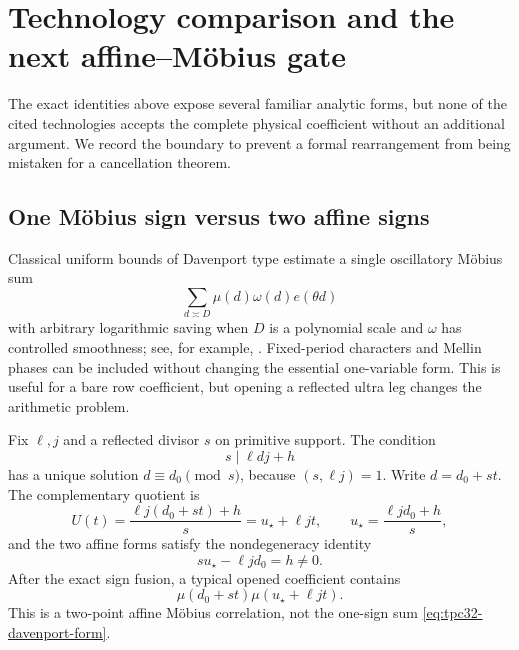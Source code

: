 \section{Technology comparison and the next affine--M\"obius gate}
\label{sec:tpc32-next-gate}

The exact identities above expose several familiar analytic forms, but none
of the cited technologies accepts the complete physical coefficient without
an additional argument.  We record the boundary to prevent a formal
rearrangement from being mistaken for a cancellation theorem.

\subsection{One M\"obius sign versus two affine signs}

Classical uniform bounds of Davenport type estimate a single oscillatory
M\"obius sum
\begin{equation}
 \sum_{d\asymp D}\mu(d)\omega(d)e(\theta d)
 \label{eq:tpc32-davenport-form}
\end{equation}
with arbitrary logarithmic saving when $D$ is a polynomial scale and
$\omega$ has controlled smoothness; see, for example,
\citet[Chapter~13]{IwaniecKowalski2004}.  Fixed-period characters and
Mellin phases can be included without changing the essential one-variable
form.  This is useful for a bare row coefficient, but opening a reflected
ultra leg changes the arithmetic problem.

Fix $\ell,j$ and a reflected divisor $s$ on primitive support.  The
condition
\begin{equation}
 s\mid \ell dj+h
 \label{eq:tpc32-reflected-divisibility}
\end{equation}
has a unique solution $d\equiv d_0\pmod s$, because
$(s,\ell j)=1$.  Write $d=d_0+st$.  The complementary quotient is
\begin{equation}
 U(t)=\frac{\ell j(d_0+st)+h}{s}
 =u_\star+\ell jt,
 \qquad
 u_\star=\frac{\ell jd_0+h}{s},
 \label{eq:tpc32-affine-quotient}
\end{equation}
and the two affine forms satisfy the nondegeneracy identity
\begin{equation}
 \boxed{su_\star-\ell jd_0=h\ne0.}
 \label{eq:tpc32-affine-determinant}
\end{equation}
After the exact sign fusion, a typical opened coefficient contains
\begin{equation}
 \mu(d_0+st)\mu(u_\star+\ell jt).
 \label{eq:tpc32-affine-mobius-correlation}
\end{equation}
This is a two-point affine M\"obius correlation, not the one-sign sum
\eqref{eq:tpc32-davenport-form}.

